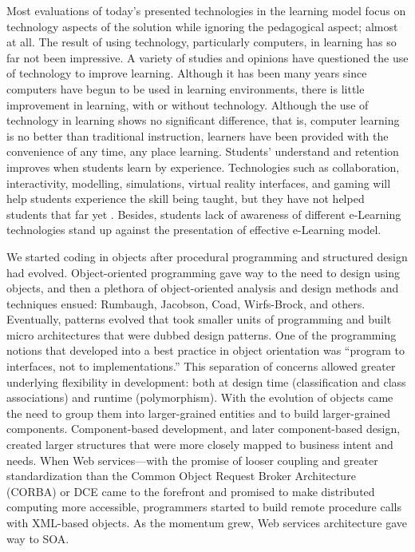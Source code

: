 \documentclass[12pt,a4paper,final,twoside,onecolumn,titlepage]{book}
\begin{document}
Most evaluations of today’s presented technologies in the learning model focus on technology aspects of the solution while ignoring the pedagogical aspect; almost at all. The result of using technology, particularly computers, in learning has so far not been impressive. A variety of studies and opinions have questioned the use of technology to improve learning. Although it has been many years since computers have begun to be used in learning environments, there is little improvement in learning, with or without technology. Although the use of technology in learning shows no significant difference, that is, computer learning is no better than traditional instruction, learners have been provided with the convenience of any time, any place learning. Students’ understand and retention improves when students learn by experience. Technologies such as collaboration, interactivity, modelling, simulations, virtual reality interfaces, and gaming will help students experience the skill being taught, but they have not helped students that far yet \cite{R07}. Besides, students lack of awareness of different e-Learning technologies stand up against the presentation of effective e-Learning model.

We started coding in objects after procedural programming and structured design had evolved. Object-oriented programming gave way to the need to design using objects, and then a plethora of object-oriented analysis and design methods and techniques ensued: Rumbaugh, Jacobson, Coad, Wirfs-Brock, and others. Eventually, patterns evolved that took smaller units of programming and built micro architectures that were dubbed design patterns. One of the programming notions that developed into a best practice in object orientation was “program to interfaces, not to implementations.” This separation of concerns allowed greater underlying flexibility in development: both at design time (classification and class associations) and runtime (polymorphism).
With the evolution of objects came the need to group them into larger-grained entities and to build larger-grained components. Component-based development, and later component-based design, created larger structures that were more closely mapped to business intent and needs. When Web services—with the promise of looser coupling and greater standardization than the Common Object Request Broker Architecture (CORBA) or \gls{DCE} came to the forefront and promised to make distributed computing more accessible, programmers started to build remote procedure calls with \gls{XML}-based objects. As the momentum grew, Web services architecture gave way to \gls{SOA}.
\end{document}
